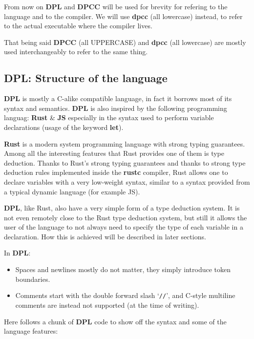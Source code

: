 \documentclass[a4paper]{article}
\begin{document}
From now on \textbf{DPL} and \textbf{DPCC} will be used for brevity for refering to the language and to the compiler.
We will use \textbf{dpcc} (all lowercase) instead, to refer to the actual executable where the compiler lives.

That being said \textbf{DPCC} (all UPPERCASE) and \textbf{dpcc} (all lowercase) are mostly used interchangeably to refer to the same thing.


\subsection{DPL: Structure of the language}

\textbf{DPL} is mostly a C-alike compatible language, in fact it borrows most of its syntax and semantics.
\textbf{DPL} is also inspired by the following programming languag: \textbf{Rust} \&
\textbf{JS} especially in the syntax used to perform variable declarations (usage of the keyword \textbf{let}).

\textbf{Rust} is a modern system programming language with strong typing guarantees.
Among all the interesting features that Rust provides one of them is type deduction.
Thanks to Rust's strong typing guarantees and thanks to strong type deduction rules implemented
inside the \textbf{rustc} compiler, Rust
allows one to declare variables with a very low-weight syntax, similar
to a syntax provided from a typical dynamic language (for example JS).

\textbf{DPL}, like Rust, also have a very simple form of a type deduction system.
It is not even remotely close to the Rust type deduction system, but still it
allows the user of the language to not always need to specify the type of each variable in a declaration.
How this is achieved will be described in later sections.

In \textbf{DPL}:

\begin{itemize}
\item Spaces and newlines mostly do not matter, they simply introduce token boundaries.
\item Comments start with the double forward slash `\texttt{//}', and C-style multiline comments are
instead not supported (at the time of writing).
\end{itemize}



Here follows a chunk of \textbf{DPL} code to show off the syntax and some of the language features:
\end{document}
